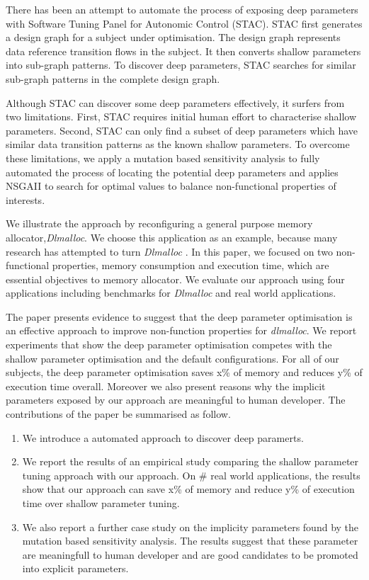 There has been an attempt to automate the process of exposing deep parameters with Software Tuning Panel for Autonomic Control (STAC)\cite{Brake:2008:ADS:1370018.1370031}. STAC first generates a design graph for a subject under optimisation. The design graph represents data reference transition flows in the subject. It then converts shallow parameters into sub-graph patterns. To discover deep parameters, STAC searches for similar sub-graph patterns in the complete design graph. 

Although STAC can discover some deep parameters effectively, it surfers from two limitations. First, STAC requires initial human effort to characterise shallow parameters. Second, STAC can only find a subset of deep parameters which have similar data transition patterns as the known shallow parameters. To overcome these limitations, we apply a mutation based sensitivity analysis to fully automated the process of locating the potential deep parameters and applies NSGAII to search for  optimal values to balance non-functional properties of interests. 

We illustrate the approach by reconfiguring a general purpose memory allocator,\emph{Dlmalloc}. We choose this application as an example, because many research has attempted to turn \emph{Dlmalloc} \cite{Risco-Martin:2009:ODM:1569901.1570116,RiscoMartin2010572}. In this paper, we focused on two non-functional properties, memory consumption and execution time, which are essential objectives to memory allocator. We evaluate our approach using four applications including benchmarks for \emph{Dlmalloc} and real world applications.

The paper presents evidence to suggest that the deep parameter optimisation is an effective approach to improve non-function properties for \emph{dlmalloc}. 
We report experiments that show the deep parameter optimisation competes with the shallow parameter optimisation and the default configurations. For all of our subjects, the deep parameter optimisation saves x\% of memory and reduces y\% of execution time overall. Moreover we also present reasons why the implicit parameters exposed by our approach are meaningful to human developer. The contributions of the paper be summarised as follow.


\begin{enumerate}

\item We introduce a automated approach to discover deep paramerts. 

\item We report the results of an empirical study comparing the shallow parameter tuning approach with our approach. On \# real world applications, the results show that our approach can save x\% of memory and reduce y\% of execution time over shallow parameter tuning. 

\item We also report a further case study on the implicity parameters found by the mutation based sensitivity analysis. The results suggest that these parameter are meaningfull to human developer and are good candidates to be promoted into explicit parameters. 

\end{enumerate}

